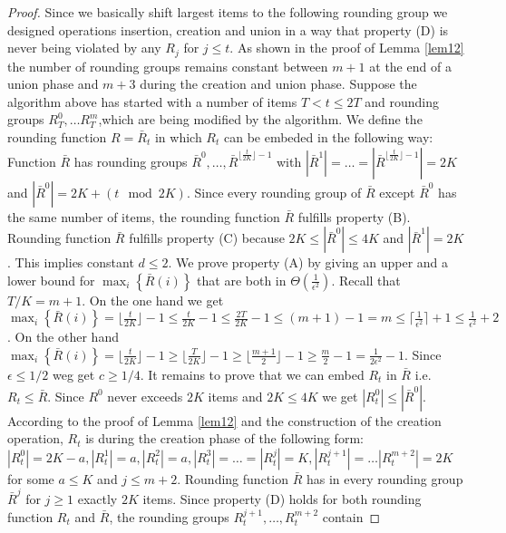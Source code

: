 \documentclass[a4paper,11pt]{article}
\newcommand{\menge}[1]{\left\{#1\right\}}
\begin{document}
\begin{proof}
	Since we basically shift largest items to the following rounding group we designed operations 
	insertion, creation and union in a way that property (D) is never being
	violated by any $R_j$ for $j \leq t$. As shown in the proof of Lemma \ref{lem12} the number of rounding groups remains
	constant between $m+1$ at the end of a union phase and $m+3$ during the creation and union phase.
	Suppose the algorithm above has started with a number of items $T<t \leq 2T$ and rounding groups 
	$R_{T}^0, \ldots R_{T}^m$,which are being modified	by the algorithm.
	We define the rounding function $R = \bar{R}_t$ in which $R_t$ can be embeded in the following way: 
	Function $\bar{R}$ has rounding groups $\bar{R}^0, \ldots , \bar{R}^{\lfloor \frac{t}{2K}\rfloor -1}$ with 
	$|\bar{R}^1|= \ldots = |\bar{R}^{\lfloor \frac{t}{2K}\rfloor-1}| = 2K$ and $|\bar{R}^0| = 2K + (t \mod 2K)$.
	Since every rounding group of $\bar{R}$ except $\bar{R}^0$ has the same number of items, the rounding function
	$\bar{R}$ fulfills property (B). Rounding function $\bar{R}$ fulfills property (C) because $2K \leq |\bar{R}^0| 
	\leq 4K$ and $|\bar{R}^1| = 2K$. This implies constant $d \leq 2$.
	We prove property (A) by giving an upper and a lower bound for $\max_{i}\menge{\bar{R}(i)}$ that are both
	in $\Theta(\frac{1}{\epsilon^2})$. Recall that $T/K = m+1$.
	On the one hand we get $\max_{i}\menge{\bar{R}(i)} =\lfloor \frac{t}{2K}\rfloor -1 \leq 
	\frac{t}{2K} -1 \leq \frac{2T}{2K} -1 \leq (m+1)-1 = m \leq \lceil \frac{1}{\epsilon^2} \rceil+1
	\leq \frac{1}{\epsilon^2} +2$.
	On the other hand $\max_{i}\menge{\bar{R}(i)} =\lfloor \frac{t}{2K}\rfloor -1 \geq \lfloor \frac{T}{2K}\rfloor -1
	\geq \lfloor \frac{m+1}{2} \rfloor -1 \geq \frac{m}{2} -1 = \frac{1}{2 \epsilon ^2} -1$. Since $\epsilon \leq 1/2$
	weg get $c \geq 1/4$.
	It remains to prove that we can embed $R_t$ in $\bar{R}$ i.e. $R_t \leq \bar{R}$. 
	Since $R^0$ never exceeds $2K$ items and $2K \leq 4K$ we get $|R_{t}^0| \leq |\bar{R}^0|$.
	According to the proof of Lemma \ref{lem12} and the construction of the creation operation, $R_t$ is during 
	the creation phase
	of the following form: $|R_{t}^0| = 2K-a, |R_{t}^1| = a, |R_{t}^2| = a, |R_{t}^3| = \ldots = |R_{t}^j|= K,
	|R_{t}^{j+1}| = \ldots |R_{t}^{m+2}| = 2K$ for some $a \leq K$ and $j \leq m+2$. Rounding function $\bar{R}$
	has in every rounding group $\bar{R}^j$ for $j\geq 1$ exactly $2K$ items.
	Since property (D) 
	holds for both rounding function $R_t$ and $\bar{R}$, the rounding groups $R_{t}^{j+1}, \ldots ,R_{t}^{m+2}$ contain

\end{proof}
\end{document}
